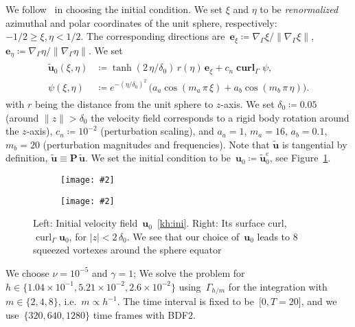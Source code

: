 \documentclass[12pt]{article}
\newcommand{\includegraphicsw}[2][1.]{\texttt{[image: \#2]}}
\newcommand{\vect}[1]{\boldsymbol{\mathbf{#1}}}
\DeclareMathOperator{\Curl}{curl}
\DeclareMathOperator{\vCurl}{\vect{curl}}
\begin{document}
We follow~\cite{lederer2019divergence} in choosing the initial condition. We set $\xi$ and $\eta$ to be \textit{renormalized} azimuthal and polar coordinates of the unit sphere, respectively: $-1/2 \ge \xi, \eta < 1/2$. The corresponding directions are~$\vect e_\xi \coloneqq \nabla_{\Gamma}\xi/\|\nabla_{\Gamma}\xi\|$, $\vect e_\eta \coloneqq \nabla_{\Gamma}\eta/\|\nabla_{\Gamma}\eta\|$. We set
\begin{align}\begin{split} \label{kh:ini}
	\tilde{\vect u}_0(\xi, \eta) &\coloneqq \tanh(2\,\eta/\delta_0)\,r(\eta)\,\vect e_\xi + c_n\vCurl_\Gamma\psi, \\
	\psi(\xi, \eta) &\coloneqq e^{-(\eta/\delta_0)^2}\,\big(a_a\cos(m_a\,\pi\,\xi) + a_b\cos(m_b\,\pi\,\eta)\big).
\end{split}\end{align}
with $r$ being the distance from the unit sphere to $z$-axis. We set $\delta_0 \coloneqq 0.05$ (around $\|z\| > \delta_0$ the velocity field corresponds to a rigid body rotation around the $z$-axis), $c_n \coloneqq 10^{-2}$ (perturbation scaling), and $a_a = 1$, $m_a = 16$, $a_b = 0.1$, $m_b = 20$ (perturbation magnitudes and frequencies). Note that $\tilde{\vect u}$ is tangential by definition, $\tilde{\vect u} \equiv \vect P\,\tilde{\vect u}$. We set the initial condition to be~$\vect u_0 \coloneqq \tilde{\vect u}_0^e$, see Figure~\ref{fig:kh:ini}.

\begin{figure}[H]
	\par\bigskip
	\centering
	\begin{subfigure}{.35\linewidth}
		\centering
		\includegraphicsw[.95]{{kh_ini_u_8.cropped}.png}
	\end{subfigure}%
	\begin{subfigure}{.65\linewidth}
		\centering
		\includegraphicsw[.95]{{kh_ini_w_8.cropped}.png}
	\end{subfigure}%
	\caption{Left: Initial velocity field~$\vect u_0$~\eqref{kh:ini}. Right: Its surface curl, $\Curl_\Gamma \vect u_0$, for $|z| < 2\,\delta_0$. We see that our choice of~$\vect u_0$ leads to 8 squeezed vortexes around the sphere equator}
	\label{fig:kh:ini}		
\end{figure}

We choose $\nu = 10^{-5}$ and $\gamma = 1$; We solve the problem for~$h \in \{1.04\times 10^{-1}, 5.21\times 10^{-2}, 2.6\times 10^{-2}\}$ using~$\Gamma_{h/m}$ for the integration with~$m \in \{ 2, 4, 8\}$, i.e.~$m \propto h^{-1}$. The time interval is fixed to be~$\lbrack0, T = 20\rbrack$, and we use~$\{ 320, 640, 1280\}$ time frames with BDF2.
\end{document}
